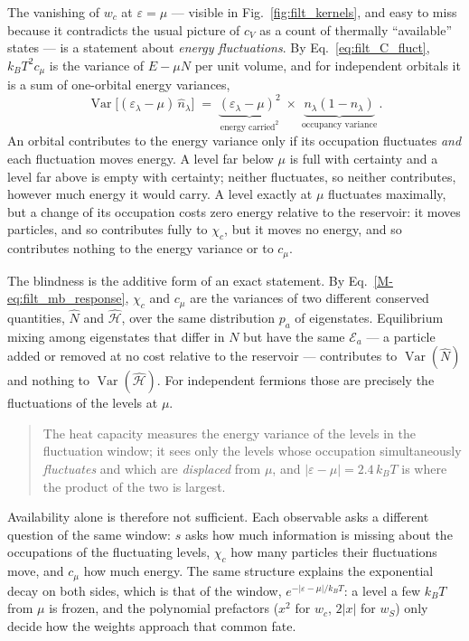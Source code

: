 \documentclass[10pt,a4paper]{article}
\theoremstyle{plain}
\theoremstyle{remark}
\newcommand{\Var}{\operatorname{Var}}
\newcommand{\enrg}{\mathcal{E}}  %
\begin{document}
The vanishing of $w_c$ at $\varepsilon=\mu$ --- visible in
Fig.~\ref{fig:filt_kernels}, and easy to miss because it contradicts the usual
picture of $c_V$ as a count of thermally ``available'' states --- is a statement
about \emph{energy fluctuations}. By Eq.~\eqref{eq:filt_C_fluct}, $ k_BT^{2}c_\mu $ is
the variance of $ E - \mu N $ per unit volume, and for independent orbitals it is a
sum of one-orbital energy variances,
\begin{equation}\label{eq:filt_product}
\Var\big[(\varepsilon_\lambda-\mu)\,\hat n_\lambda\big]
\;=\;
\underbrace{(\varepsilon_\lambda-\mu)^{2}}_{\text{energy carried}^{2}}
\;\times\;
\underbrace{n_\lambda(1-n_\lambda)}_{\text{occupancy variance}}\,.
\end{equation}
An orbital contributes to the energy variance only if its occupation fluctuates
\emph{and} each fluctuation moves energy. A level far below $ \mu $ is full with
certainty and a level far above is empty with certainty; neither fluctuates, so
neither contributes, however much energy it would carry. A level exactly at $ \mu $
fluctuates maximally, but a change of its occupation costs zero energy relative
to the reservoir: it moves particles, and so contributes fully to $ \chi_c $, but it
moves no energy, and so contributes nothing to the energy variance or to $ c_\mu $.

The blindness is the additive form of an exact statement. By
Eq.~\eqref{M-eq:filt_mb_response}, $ \chi_c $ and $ c_\mu $ are the variances of two
different conserved quantities, $ \hat N $ and $ \hat{\mathcal{H}} $, over the same distribution
$ p_a $ of eigenstates. Equilibrium mixing among eigenstates that differ in $ N $ but
have the same $ \enrg_a $ --- a particle added or removed at no cost relative to the
reservoir --- contributes to $ \Var(\hat N) $ and nothing to $ \Var(\hat{\mathcal{H}}) $. For independent
fermions those are precisely the fluctuations of the levels at $ \mu $.

\begin{quote}
The heat capacity measures the energy variance of the levels in the fluctuation
window; it sees only the levels whose occupation simultaneously \emph{fluctuates}
and which are \emph{displaced} from $ \mu $, and $|\varepsilon-\mu|=2.4\,k_BT$ is where the
product of the two is largest.
\end{quote}

Availability alone is therefore not sufficient. Each observable asks a different
question of the same window: $ s $ asks how much information is missing about
the occupations of the fluctuating levels, $ \chi_c $ how many particles their fluctuations move, and $ c_\mu $ how
much energy. The same structure explains the exponential decay on both sides,
which is that of the window, $ e^{-|\varepsilon-\mu|/k_BT} $: a level a few $ k_BT $
from $ \mu $ is frozen, and the polynomial prefactors ($ x^{2} $ for $ w_c $, $ 2|x| $
for $ w_S $) only decide how the weights approach that common fate.
\end{document}
